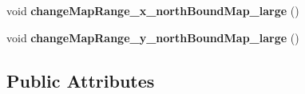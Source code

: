 \begin{DoxyCompactItemize}
\item 
void {\bfseries change\+Map\+Range\+\_\+x\+\_\+north\+Bound\+Map\+\_\+large} ()\hypertarget{class_map__traffic__large_a2abfca103c550a9a5ec5a815b26d9b53}{}\label{class_map__traffic__large_a2abfca103c550a9a5ec5a815b26d9b53}

\item 
void {\bfseries change\+Map\+Range\+\_\+y\+\_\+north\+Bound\+Map\+\_\+large} ()\hypertarget{class_map__traffic__large_a7be67020e191b55ddb65c331b649fbb9}{}\label{class_map__traffic__large_a7be67020e191b55ddb65c331b649fbb9}

\end{DoxyCompactItemize}
\subsection*{Public Attributes}
